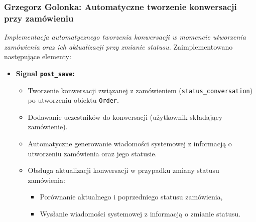 \documentclass[12pt,a4paper,oneside]{article}
\theoremstyle{definition}
\numberwithin{equation}{section}
\begin{document}
\subsubsection{Grzegorz Golonka: Automatyczne tworzenie konwersacji przy zamówieniu}
\label{section:1.3.29}
\textit{
Implementacja automatycznego tworzenia konwersacji w momencie utworzenia zamówienia oraz ich aktualizacji przy zmianie statusu.
}
Zaimplementowano następujące elementy:
\begin{itemize}
    \item \textbf{Signal \texttt{post\_save}:}
    \begin{itemize}
        \item Tworzenie konwersacji związanej z zamówieniem (\texttt{status\_conversation}) po utworzeniu obiektu \texttt{Order}.
        \item Dodawanie uczestników do konwersacji (użytkownik składający zamówienie).
        \item Automatyczne generowanie wiadomości systemowej z informacją o utworzeniu zamówienia oraz jego statusie.
        \item Obsługa aktualizacji konwersacji w przypadku zmiany statusu zamówienia:
        \begin{itemize}
            \item Porównanie aktualnego i poprzedniego statusu zamówienia,
            \item Wysłanie wiadomości systemowej z informacją o zmianie statusu.
        \end{itemize}
    \end{itemize}
\end{itemize}
% 
% 
\end{document}
